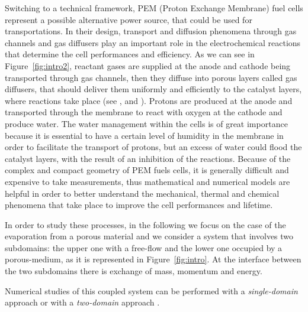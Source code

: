 Switching to a technical framework, PEM (Proton Exchange Membrane) fuel cells represent a possible alternative power source, that could be used for transportations. In their design, transport and diffusion phenomena through gas channels and gas diffusers play an important role in the electrochemical reactions that determine the cell performances and efficiency. As we can see in Figure~\ref{fig:intro2}, reactant gases are supplied at the anode and cathode being transported through gas channels, then they diffuse into porous layers called gas diffusers, that should deliver them uniformly and efficiently to the catalyst layers, where reactions take place (see \cite{wu:fuelcell}, \cite{tesi:baber} and \cite{tesi:pem}). Protons are produced at the anode and transported through the membrane to react with oxygen at the cathode and produce water. The water management within the cells is of great importance because it is essential to have a certain level of humidity in the membrane in order to facilitate the transport of protons, but an excess of water could flood the catalyst layers, with the result of an inhibition of the reactions.
Because of the complex and compact geometry of PEM fuels cells, it is generally difficult and expensive to take measurements, thus mathematical and numerical models are helpful in order to better understand the mechanical, thermal and chemical phenomena that take place to improve the cell performances and lifetime.

In order to study these processes, in the following we focus on the case of the evaporation from 
a porous material and we consider a system that involves two subdomains: the 
upper one with a free-flow and the lower one occupied by a porous-medium, as it is represented in Figure~\ref{fig:intro}.
At the interface between the two subdomains there is exchange of mass, momentum 
and energy.

Numerical studies of this coupled system can be performed with a 
\emph{single-domain} approach or with a \emph{two-domain} approach 
\cite{tesi:fetzer}.

